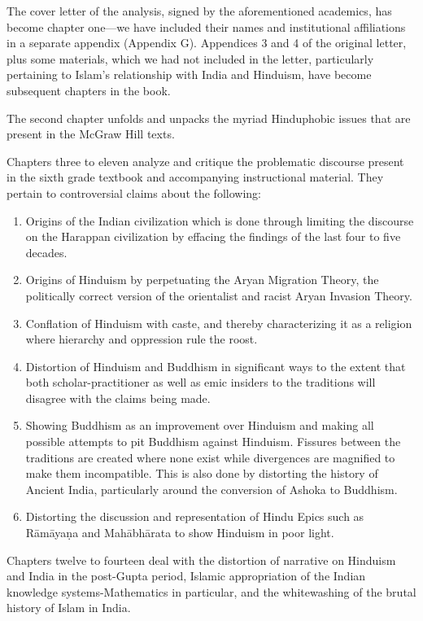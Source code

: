 The cover letter of the analysis, signed by the aforementioned academics, has become chapter one—we have included their names and institutional affiliations in a separate appendix (Appendix G). Appendices 3 and 4 of the original letter, plus some materials, which we had not included in the letter, particularly pertaining to Islam’s relationship with India and Hinduism, have become subsequent chapters in the book. 

The second chapter unfolds and unpacks the myriad Hinduphobic issues that are present in the McGraw Hill texts.

Chapters three to eleven analyze and critique the problematic discourse present in the sixth grade textbook and accompanying instructional material. They pertain to controversial claims about the following:
\begin{enumerate}
\item Origins of the Indian civilization which is done through limiting the discourse on the Harappan civilization by effacing the findings of the last four to five decades.
\item Origins of Hinduism by perpetuating the Aryan Migration Theory, the politically correct version of the orientalist and racist Aryan Invasion Theory. 
\item Conflation of Hinduism with caste, and thereby characterizing it as a religion where hierarchy and oppression rule the roost. 
\item Distortion of Hinduism and Buddhism in significant ways to the extent that both scholar-practitioner as well as emic insiders to the traditions will disagree with the claims being made. 
\item Showing Buddhism as an improvement over Hinduism and making all possible attempts to pit Buddhism against Hinduism. Fissures between the traditions are created where none exist while divergences are magnified to make them incompatible. This is also done by distorting the history of Ancient India, particularly around the conversion of Ashoka to Buddhism. 
\item Distorting the discussion and representation of Hindu Epics such as Rāmāyaṇa and Mahābhārata to show Hinduism in poor light. 
\end{enumerate}
Chapters twelve to fourteen deal with the distortion of narrative on Hinduism and India in the post-Gupta period, Islamic appropriation of the Indian knowledge systems-Mathematics in particular, and the whitewashing of the brutal history of Islam in India. 
